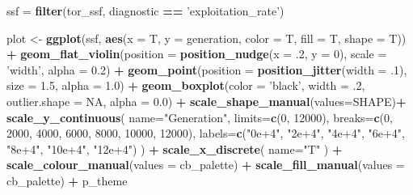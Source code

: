 \documentclass[]{book}
\newenvironment{Shaded}{\begin{snugshade}}{\end{snugshade}}
\newcommand{\DataTypeTok}[1]{\textcolor[rgb]{0.13,0.29,0.53}{#1}}
\newcommand{\DecValTok}[1]{\textcolor[rgb]{0.00,0.00,0.81}{#1}}
\newcommand{\FloatTok}[1]{\textcolor[rgb]{0.00,0.00,0.81}{#1}}
\newcommand{\KeywordTok}[1]{\textcolor[rgb]{0.13,0.29,0.53}{\textbf{#1}}}
\newcommand{\NormalTok}[1]{#1}
\newcommand{\OperatorTok}[1]{\textcolor[rgb]{0.81,0.36,0.00}{\textbf{#1}}}
\newcommand{\OtherTok}[1]{\textcolor[rgb]{0.56,0.35,0.01}{#1}}
\newcommand{\StringTok}[1]{\textcolor[rgb]{0.31,0.60,0.02}{#1}}
\begin{document}
\begin{Shaded}
\begin{Highlighting}[]
\NormalTok{ssf =}\StringTok{ }\KeywordTok{filter}\NormalTok{(tor_ssf, diagnostic }\OperatorTok{==}\StringTok{ 'exploitation_rate'}\NormalTok{)}

\NormalTok{plot <-}\StringTok{ }\KeywordTok{ggplot}\NormalTok{(ssf, }\KeywordTok{aes}\NormalTok{(}\DataTypeTok{x =}\NormalTok{ T, }\DataTypeTok{y =}\NormalTok{ generation, }\DataTypeTok{color =}\NormalTok{ T, }\DataTypeTok{fill =}\NormalTok{ T, }\DataTypeTok{shape =}\NormalTok{ T)) }\OperatorTok{+}
\StringTok{  }\KeywordTok{geom_flat_violin}\NormalTok{(}\DataTypeTok{position =} \KeywordTok{position_nudge}\NormalTok{(}\DataTypeTok{x =} \FloatTok{.2}\NormalTok{, }\DataTypeTok{y =} \DecValTok{0}\NormalTok{), }\DataTypeTok{scale =} \StringTok{'width'}\NormalTok{, }\DataTypeTok{alpha =} \FloatTok{0.2}\NormalTok{) }\OperatorTok{+}
\StringTok{  }\KeywordTok{geom_point}\NormalTok{(}\DataTypeTok{position =} \KeywordTok{position_jitter}\NormalTok{(}\DataTypeTok{width =} \FloatTok{.1}\NormalTok{), }\DataTypeTok{size =} \FloatTok{1.5}\NormalTok{, }\DataTypeTok{alpha =} \FloatTok{1.0}\NormalTok{) }\OperatorTok{+}
\StringTok{  }\KeywordTok{geom_boxplot}\NormalTok{(}\DataTypeTok{color =} \StringTok{'black'}\NormalTok{, }\DataTypeTok{width =} \FloatTok{.2}\NormalTok{, }\DataTypeTok{outlier.shape =} \OtherTok{NA}\NormalTok{, }\DataTypeTok{alpha =} \FloatTok{0.0}\NormalTok{) }\OperatorTok{+}
\StringTok{  }\KeywordTok{scale_shape_manual}\NormalTok{(}\DataTypeTok{values=}\NormalTok{SHAPE)}\OperatorTok{+}
\StringTok{  }\KeywordTok{scale_y_continuous}\NormalTok{(}
    \DataTypeTok{name=}\StringTok{"Generation"}\NormalTok{,}
    \DataTypeTok{limits=}\KeywordTok{c}\NormalTok{(}\DecValTok{0}\NormalTok{, }\DecValTok{12000}\NormalTok{),}
    \DataTypeTok{breaks=}\KeywordTok{c}\NormalTok{(}\DecValTok{0}\NormalTok{, }\DecValTok{2000}\NormalTok{, }\DecValTok{4000}\NormalTok{, }\DecValTok{6000}\NormalTok{, }\DecValTok{8000}\NormalTok{, }\DecValTok{10000}\NormalTok{, }\DecValTok{12000}\NormalTok{),}
    \DataTypeTok{labels=}\KeywordTok{c}\NormalTok{(}\StringTok{"0e+4"}\NormalTok{, }\StringTok{"2e+4"}\NormalTok{, }\StringTok{"4e+4"}\NormalTok{, }\StringTok{"6e+4"}\NormalTok{, }\StringTok{"8e+4"}\NormalTok{, }\StringTok{"10e+4"}\NormalTok{, }\StringTok{"12e+4"}\NormalTok{)}
\NormalTok{  ) }\OperatorTok{+}
\StringTok{  }\KeywordTok{scale_x_discrete}\NormalTok{(}
    \DataTypeTok{name=}\StringTok{"T"}
\NormalTok{  ) }\OperatorTok{+}
\StringTok{  }\KeywordTok{scale_colour_manual}\NormalTok{(}\DataTypeTok{values =}\NormalTok{ cb_palette) }\OperatorTok{+}
\StringTok{  }\KeywordTok{scale_fill_manual}\NormalTok{(}\DataTypeTok{values =}\NormalTok{ cb_palette) }\OperatorTok{+}
\StringTok{  }\NormalTok{p_theme}


\end{Highlighting}
\end{Shaded}
\end{document}

